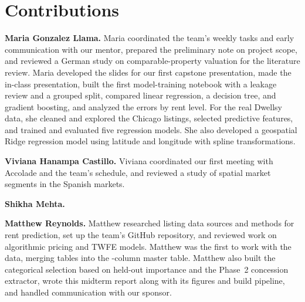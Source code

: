 \section*{Contributions}

\textbf{Maria Gonzalez Llama.} Maria coordinated the team's weekly tasks and early communication with
our mentor, prepared the preliminary note on project scope, and reviewed a German study on
comparable-property valuation for the literature review. Maria developed the slides for our first
capstone presentation, made the in-class presentation, built the first model-training notebook with a leakage review and a grouped
split, compared linear regression, a decision tree, and gradient boosting, and analyzed the errors by
rent level. For the real Dwellsy data, she cleaned and explored the Chicago listings, 
selected predictive features, and trained and evaluated five regression models. She also developed
a geospatial Ridge regression model using
latitude and longitude with spline transformations.

\textbf{Viviana Hanampa Castillo.} Viviana coordinated our first meeting with Accolade and the team's
schedule, and reviewed a study of spatial market segments in the Spanish markets. 

\textbf{Shikha Mehta.} 

\textbf{Matthew Reynolds.} Matthew researched listing data sources and  methods for rent
prediction, set up the team's GitHub repository, and reviewed work on algorithmic pricing and TWFE
models. Matthew was the first to work with the data, merging \nMasterTables{} tables into the
\nMasterCols{}-column master table. Matthew also built the categorical selection based on held-out
importance and the Phase~2 concession extractor, wrote this midterm report along with its figures
and build pipeline, and handled communication with our sponsor.


